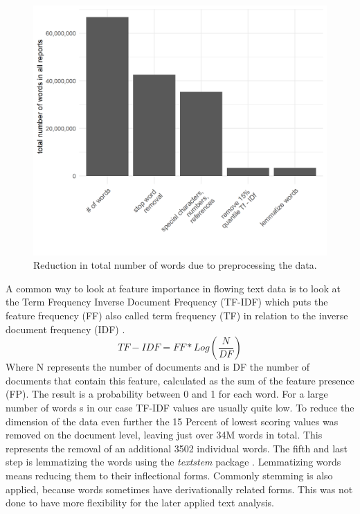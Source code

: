 \begin{figure}[h]
\centering
\includegraphics[width=\textwidth]{figures/ReductionInTotalNWords.png}
\caption{Reduction in total number of words due to preprocessing the data.}
\label{fig:TotWord}
\end{figure}

A common way to look at feature importance in flowing text data is to look at the Term Frequency Inverse Document Frequency (TF-IDF) which puts the feature frequency (FF) also called term frequency (TF) in relation to the inverse document frequency (IDF) \citep{na2004effectiveness}. 
\begin{equation}
    TF-IDF = FF * Log(\frac{N}{DF})
\end{equation} 
Where N represents the number of documents and is DF the number of documents that contain this feature, calculated as the sum of the feature presence (FP). The result is a probability between 0 and 1 for each word. For a large number of words s in our case TF-IDF values are usually quite low. To reduce the dimension of the data even further the 15 Percent of lowest scoring values was removed on the document level, leaving just over 34M words in total. This represents the removal of an additional 3502 individual words. The fifth and last step is lemmatizing the words using the \textit{textstem} package \citep{textstem}. Lemmatizing words means reducing them to their inflectional forms. Commonly stemming is also applied, because words sometimes have derivationally related forms. This was not done to have more flexibility for the later applied text analysis. \\ \\

